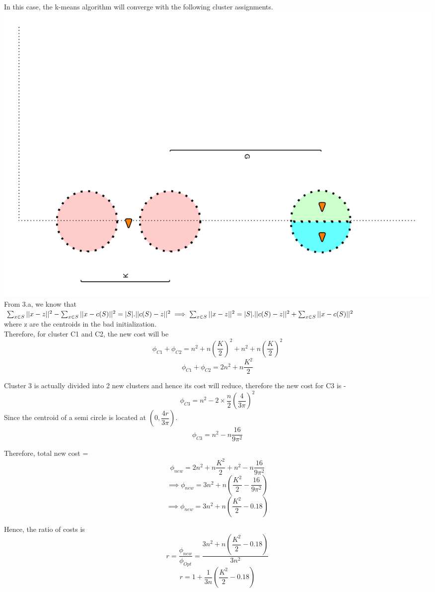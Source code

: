 \documentclass[11pt]{article}
\begin{document}
{In this case, the k-means algorithm will converge with the following cluster assignments.\\
\includegraphics[scale=0.8]{q3_3} \\

From 3.a, we know that \\

$
\sum_{x \in S} || x - z ||^2 - \sum_{x \in S} || x - c(S)||^2 = |S| . || c(S) - z ||^2 \\ \\
\implies \sum_{x \in S} || x - z ||^2 = |S| . || c(S) - z ||^2 + \sum_{x \in S} || x - c(S)||^2
$ \\

where z are the centroids in the bad initialization. \\

Therefore, for cluster C1 and C2, the new cost will be
$$\phi_{C1} + \phi_{C2} = n^2 + n (\dfrac{K}{2})^2 + n^2 + n (\dfrac{K}{2})^2$$
$$\phi_{C1} + \phi_{C2} = 2n^2 + n \dfrac{K^2}{2} $$

Cluster 3 is actually divided into 2 new clusters and hence its cost will reduce, therefore the new cost for C3 is -
$$\phi_{C3} = n^2 - 2 \times \frac{n}{2} (\dfrac{4}{3\pi})^2$$
Since the centroid of a semi circle is located at $(0, \dfrac{4r}{3\pi})$.
$$\phi_{C3} = n^2 - n \dfrac{16}{9 \pi^2}$$

Therefore, total new cost = 
$$\phi_{new} = 2n^2 + n \dfrac{K^2}{2} + n^2 - n \dfrac{16}{9 \pi^2} $$
$$\implies \phi_{new} = 3n^2 + n (\dfrac{K^2}{2} - \dfrac{16}{9 \pi^2})  $$
$$\implies \phi_{new} = 3n^2 + n (\dfrac{K^2}{2} - 0.18)  $$

Hence, the ratio of costs is
$$ r = \dfrac{\phi_{new}}{\phi_{Opt}} = \dfrac{3n^2 + n (\dfrac{K^2}{2} - 0.18)}{3n^2}$$
$$ r = 1 + \frac{1}{3n} (\dfrac{K^2}{2} - 0.18)$$

}
\end{document}
